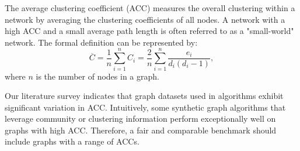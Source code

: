 \documentclass[conference]{IEEEtran}
\theoremstyle{plain}
\begin{document}
The average clustering coefficient (ACC) \cite{watts1998collective} measures the overall clustering within a network by averaging the clustering coefficients of all nodes. 
A network with a high ACC and a small average path length is often referred to as a "small-world" network.
The formal definition can be represented by:
    \begin{equation}
         \overline{C}=\frac{1}{n}\sum_{i=1}^{n}C_i=\frac{2}{n}\sum_{i=1}^{n}\frac{e_i}{d_i(d_i-1)},
    \end{equation}
where $n$ is the number of nodes in a graph.

Our literature survey indicates that graph datasets used in algorithms exhibit significant variation in ACC. 
Intuitively, some synthetic graph algorithms \cite{yuan2023privgraph,ju2019generating,chen2019publishing,liu2020local,qin2017generating} that leverage community or clustering information perform exceptionally well on graphs with high ACC. 
Therefore, a fair and comparable benchmark should include graphs with a range of ACCs.
\end{document}
